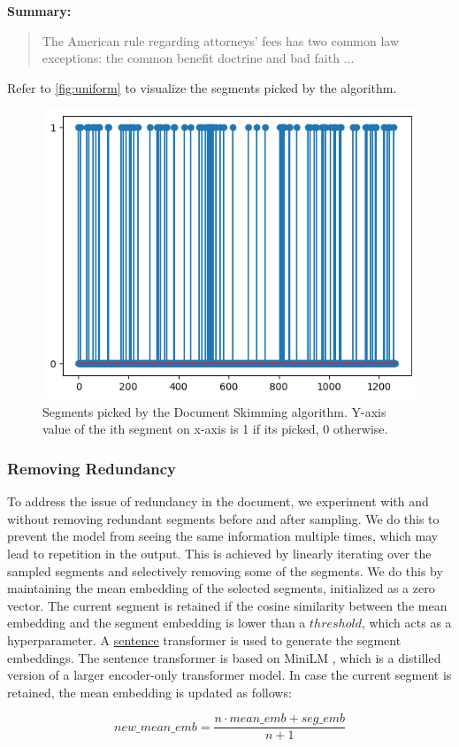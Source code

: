 \noindent \textbf{Summary:}
\begin{quote}
  The American rule regarding attorneys' fees has two common law exceptions: the common benefit doctrine and bad faith ...
\end{quote}

Refer to \autoref{fig:uniform} to visualize the segments picked by the algorithm.

\begin{figure}
  \centering
  \includegraphics*[width=.45\textwidth]{images/uniform.png}
  \caption{Segments picked by the Document Skimming algorithm. Y-axis value of the ith segment
  on x-axis is 1 if its picked, 0 otherwise.}
  \label{fig:uniform}
\end{figure}

\subsubsection*{Removing Redundancy}

To address the issue of redundancy in the document, we experiment with and without removing redundant segments before and after sampling.
We do this to prevent the model from seeing the same information multiple times, which may lead to repetition in the output.
This is achieved by linearly iterating over the sampled segments and selectively removing some of the segments.
We do this by maintaining the mean embedding of the selected segments, initialized as a zero vector.
The current segment is retained if the cosine similarity between the mean embedding and the segment embedding is lower than a $threshold$, which acts as a hyperparameter.
A \href{https://huggingface.co/sentence-transformers/all-MiniLM-L6-v2}{sentence} transformer is used to generate the segment embeddings.
The sentence transformer is based on MiniLM \cite{wang2020minilm}, which is a distilled version of a larger encoder-only transformer model.
In case the current segment is retained, the mean embedding is updated as follows:

\[ new\_mean\_emb = \frac{n \cdot mean\_emb + seg\_emb}{n + 1} \]

